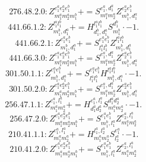 \documentclass[letterpaper,10pt,fleqn,leqno,onecolumn]{article}
\begin{document}
\begin{equation} \;\;\;\;\;\;  276.48.2.0: Z^{e_{1}^{a}e_{2}^{a}e_{1}^{b}}_{m_{1}^{a}m_{2}^{a}m_{1}^{b}}+=S^{e_{1}^{a},d_{1}^{a}}_{m_{1}^{a}m_{2}^{a}}Z^{e_{2}^{a}e_{1}^{b}}_{m_{1}^{b},d_{1}^{a}} \end{equation}
\begin{equation} \;\;\;\;\;\;  441.66.1.2: Z^{l_{1}^{a}l_{1}^{b}}_{m_{1}^{b},d_{1}^{a}}+=H^{l_{1}^{a}l_{1}^{b}}_{d_{1}^{b},d_{1}^{a}}S^{d_{1}^{b}}_{m_{1}^{b}}\cdot -1. \end{equation}
\begin{equation} \;\;\;\;\;\;  441.66.2.1: Z^{e_{1}^{a}e_{1}^{b}}_{m_{1}^{b},d_{1}^{a}}+=S^{e_{1}^{a}e_{1}^{b}}_{l_{1}^{a}l_{1}^{b}}Z^{l_{1}^{a}l_{1}^{b}}_{m_{1}^{b},d_{1}^{a}} \end{equation}
\begin{equation} \;\;\;\;\;\;  441.66.3.0: Z^{e_{1}^{a}e_{2}^{a}e_{1}^{b}}_{m_{1}^{a}m_{2}^{a}m_{1}^{b}}+=S^{e_{1}^{a},d_{1}^{a}}_{m_{1}^{a}m_{2}^{a}}Z^{e_{2}^{a}e_{1}^{b}}_{m_{1}^{b},d_{1}^{a}} \end{equation}
\begin{equation} \;\;\;\;\;\;  301.50.1.1: Z^{e_{1}^{a}e_{1}^{b}}_{m_{1}^{b},d_{1}^{a}}+=S^{e_{1}^{a}e_{1}^{b}}_{l_{1}^{a}l_{1}^{b}}H^{l_{1}^{a}l_{1}^{b}}_{m_{1}^{b},d_{1}^{a}}\cdot -1. \end{equation}
\begin{equation} \;\;\;\;\;\;  301.50.2.0: Z^{e_{1}^{a}e_{2}^{a}e_{1}^{b}}_{m_{1}^{a}m_{2}^{a}m_{1}^{b}}+=S^{e_{1}^{a},d_{1}^{a}}_{m_{1}^{a}m_{2}^{a}}Z^{e_{2}^{a}e_{1}^{b}}_{m_{1}^{b},d_{1}^{a}} \end{equation}
\begin{equation} \;\;\;\;\;\;  256.47.1.1: Z^{e_{1}^{a},l_{1}^{a}}_{m_{1}^{a}m_{2}^{a}}+=H^{e_{1}^{a},l_{1}^{a}}_{d_{1}^{a}d_{2}^{a}}S^{d_{1}^{a}d_{2}^{a}}_{m_{1}^{a}m_{2}^{a}}\cdot -1. \end{equation}
\begin{equation} \;\;\;\;\;\;  256.47.2.0: Z^{e_{1}^{a}e_{2}^{a}e_{1}^{b}}_{m_{1}^{a}m_{2}^{a}m_{1}^{b}}+=S^{e_{1}^{a}e_{1}^{b}}_{m_{1}^{b},l_{1}^{a}}Z^{e_{2}^{a},l_{1}^{a}}_{m_{1}^{a}m_{2}^{a}} \end{equation}
\begin{equation} \;\;\;\;\;\;  210.41.1.1: Z^{e_{1}^{a},l_{1}^{a}}_{m_{1}^{a}m_{2}^{a}}+=H^{l_{1}^{a},l_{2}^{a}}_{m_{1}^{a}m_{2}^{a}}S^{e_{1}^{a}}_{l_{2}^{a}}\cdot -1. \end{equation}
\begin{equation} \;\;\;\;\;\;  210.41.2.0: Z^{e_{1}^{a}e_{2}^{a}e_{1}^{b}}_{m_{1}^{a}m_{2}^{a}m_{1}^{b}}+=S^{e_{1}^{a}e_{1}^{b}}_{m_{1}^{b},l_{1}^{a}}Z^{e_{2}^{a},l_{1}^{a}}_{m_{1}^{a}m_{2}^{a}} \end{equation}
\end{document}
